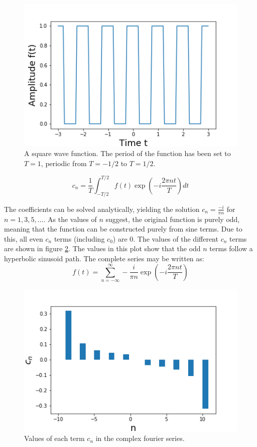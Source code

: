 \documentclass[twocolumn]{article}
\begin{document}
\begin{figure}
\centering
\includegraphics[width=\linewidth]{Figure1}
\caption{A square wave function. The period of the function has been set to $T=1$, periodic from $T=-1/2$ to $T=1/2$.}
\label{fig:square}
\end{figure}

\begin{equation}
c_n = \frac{1}{T} \int_{-T/2}^{T/2} f(t) \exp(-i\frac{2\pi nt}{T}) dt
\label{eq:complex_coefficients}
\end{equation}

The coefficients can be solved analytically, yielding the solution $c_n =
\frac{-i}{\pi n}$ for $n = 1, 3, 5, \ldots$. As the values of $n$ suggest, the
original function is purely odd, meaning that the function can be constructed
purely from sine terms. Due to this, all even $c_n$ terms (including $c_0$) are
$0$. The values of the different $c_n$ terms are shown in figure
\ref{fig:Figure2}. The values in this plot show that the odd $n$ terms follow a
hyperbolic sinusoid path. The complete series may be written as:
\[
f(t) = \sum_{n= -\infty}^{\infty} -\frac{i}{\pi n} \exp(-i \frac{2\pi nt}{T})
\]

\begin{figure}
\centering
\includegraphics[width=\linewidth]{Figure2}
\caption{Values of each term $c_n$ in the complex fourier series.}
\label{fig:Figure2}
\end{figure}
\end{document}
